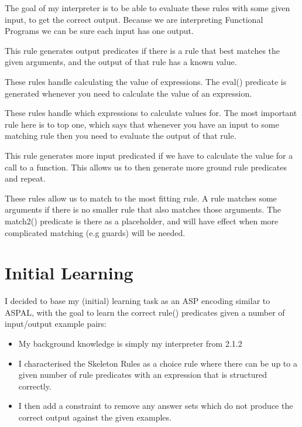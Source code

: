 The goal of my interpreter is to be able to evaluate these rules with some given input, to get the correct output. Because we are interpreting Functional Programs we can be sure each input has one output.



This rule generates output predicates if there is a rule that best matches the given arguments, and the output of that rule has a known value.



These rules handle calculating the value of expressions. The eval() predicate is generated whenever you need to calculate the value of an expression.



These rules handle which expressions to calculate values for. The most important rule here is to top one, which says that whenever you have an input to some matching rule then you need to evaluate the output of that rule.



This rule generates more input predicated if we have to calculate the value for a call to a function. This allows us to then generate more ground rule predicates and repeat.



These rules allow us to match to the most fitting rule. A rule matches some arguments if there is no smaller rule that also matches those arguments. The match2() predicate is there as a placeholder, and will have effect when more complicated matching (e.g guards) will be needed.

\section{Initial Learning}

I decided to base my (initial) learning task as an ASP encoding similar to ASPAL, with the goal to learn the correct rule() predicates given a number of input/output example pairs:

\begin{itemize}
\item My background knowledge is simply my interpreter from 2.1.2
\item I characterised the Skeleton Rules as a choice rule where there can be up to a given number of rule predicates with an expression that is structured correctly. 

\item I then add a constraint to remove any answer sets which do not produce the correct output against the given examples.

\end{itemize}

